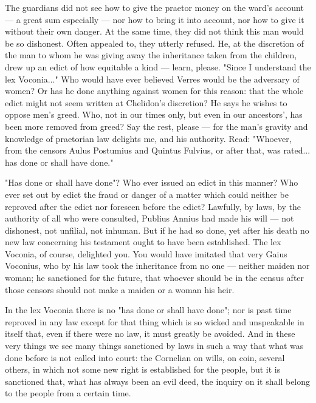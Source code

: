  The guardians did not see how to give the praetor money on the ward's account --- a great sum especially --- nor how to bring it into account, nor how to give it without their own danger. At the same time, they did not think this man would be so dishonest. Often appealed to, they utterly refused. He, at the discretion of the man to whom he was giving away the inheritance taken from the children, drew up an edict of how equitable a kind --- learn, please. "Since I understand the lex Voconia..." Who would have ever believed Verres would be the adversary of women? Or has he done anything against women for this reason: that the whole edict might not seem written at Chelidon's discretion? He says he wishes to oppose men's greed. Who, not in our times only, but even in our ancestors', has been more removed from greed? Say the rest, please --- for the man's gravity and knowledge of praetorian law delights me, and his authority. Read: "Whoever, from the censors Aulus Postumius and Quintus Fulvius, or after that, was rated... has done or shall have done."

 "Has done or shall have done"? Who ever issued an edict in this manner? Who ever set out by edict the fraud or danger of a matter which could neither be reproved after the edict nor foreseen before the edict? Lawfully, by laws, by the authority of all who were consulted, Publius Annius had made his will --- not dishonest, not unfilial, not inhuman. But if he had so done, yet after his death no new law concerning his testament ought to have been established. The lex Voconia, of course, delighted you. You would have imitated that very Gaius Voconius, who by his law took the inheritance from no one --- neither maiden nor woman; he sanctioned for the future, that whoever should be in the census after those censors should not make a maiden or a woman his heir.

 In the lex Voconia there is no "has done or shall have done"; nor is past time reproved in any law except for that thing which is so wicked and unspeakable in itself that, even if there were no law, it must greatly be avoided. And in these very things we see many things sanctioned by laws in such a way that what was done before is not called into court: the Cornelian on wills, on coin, several others, in which not some new right is established for the people, but it is sanctioned that, what has always been an evil deed, the inquiry on it shall belong to the people from a certain time.

